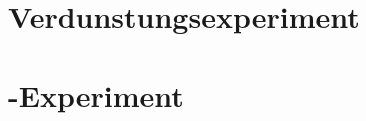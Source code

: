 
\label{sec:con}
\section{Verdunstungsexperiment}
\label{con:eva}
\section{\COT-Experiment}
\label{con:cot}
